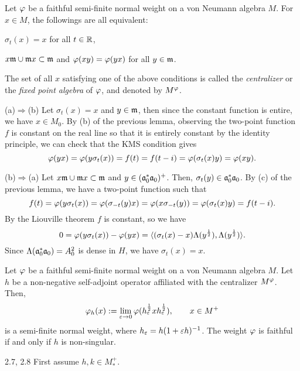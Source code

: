 \documentclass{../../small}
\begin{document}
\begin{prop}[Centralizers]
Let $\varphi$ be a faithful semi-finite normal weight on a von Neumann algebra $M$.
For $x\in M$, the followings are all equivalent:
\begin{parts}
\item $\sigma_t(x)=x$ for all $t\in\mathbb{R}$,
\item $x\mathfrak{m}\cup\mathfrak{m} x\subset\mathfrak{m}$ and $\varphi(xy)=\varphi(yx)$ for all $y\in\mathfrak{m}$.
\end{parts}
The set of all $x$ satisfying one of the above conditions is called the \emph{centralizer} or the \emph{fixed point algebra} of $\varphi$, and denoted by $M^\varphi$.
\end{prop}
\begin{pf}
(a)$\Rightarrow$(b)
Let $\sigma_t(x)=x$ and $y\in\mathfrak{m}$, then since the constant function is entire, we have $x\in M_0$.
By (b) of the previous lemma, observing the two-point function $f$ is constant on the real line so that it is entirely constant by the identity principle, we can check that the KMS condition gives
\[\varphi(yx)=\varphi(y\sigma_t(x))=f(t)=f(t-i)=\varphi(\sigma_t(x)y)=\varphi(xy).\]

(b)$\Rightarrow$(a)
Let $x\mathfrak{m}\cup\mathfrak{m} x\subset\mathfrak{m}$ and $y\in(\mathfrak{a}_0^*\mathfrak{a}_0)^+$.
Then, $\sigma_t(y)\in\mathfrak{a}_0^*\mathfrak{a}_0$.
By (c) of the previous lemma, we have a two-point function such that
\[f(t)=\varphi(y\sigma_t(x))=\varphi(\sigma_{-t}(y)x)=\varphi(x\sigma_{-t}(y))=\varphi(\sigma_t(x)y)=f(t-i).\]
By the Liouville theorem $f$ is constant, so we have
\[0=\varphi(y\sigma_t(x))-\varphi(yx)=\langle(\sigma_t(x)-x)\Lambda(y^{\frac12}),\Lambda(y^{\frac12})\rangle.\]
Since $\Lambda(\mathfrak{a}_0^*\mathfrak{a}_0)=A_0^2$ is dense in $H$, we have $\sigma_t(x)=x$.
\end{pf}





\begin{prop}
Let $\varphi$ be a faithful semi-finite normal weight on a von Neumann algebra $M$.
Let $h$ be a non-negative self-adjoint operator affiliated with the centralizer $M^\varphi$.
Then,
\[\varphi_h(x):=\lim_{\varepsilon\to0}\varphi(h_\varepsilon^{\frac12}xh_\varepsilon^{\frac12}),\qquad x\in M^+\]
is a semi-finite normal weight, where $h_\varepsilon=h(1+\varepsilon h)^{-1}$.
The weight $\varphi$ is faithful if and only if $h$ is non-singular.
\end{prop}
\begin{pf}
2.7, 2.8
First assume $h,k\in M_*^+$.


\end{pf}

\iffalse
\end{document}
